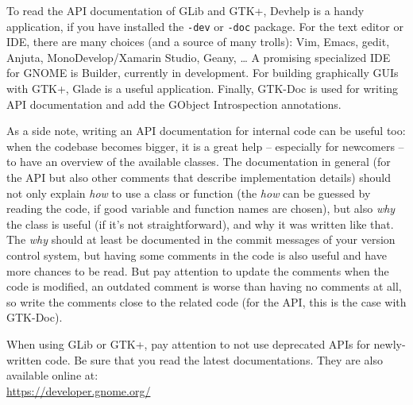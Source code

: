 To read the API documentation of GLib and GTK+, Devhelp is a handy application, if you have installed the \texttt{-dev} or \texttt{-doc} package. For the text editor or IDE, there are many choices (and a source of many trolls): Vim, Emacs, gedit, Anjuta, MonoDevelop/Xamarin Studio, Geany, … A promising specialized IDE for GNOME is Builder, currently in development. For building graphically GUIs with GTK+, Glade is a useful application. Finally, GTK-Doc is used for writing API documentation and add the GObject Introspection annotations.

As a side note, writing an API documentation for internal code can be useful too: when the codebase becomes bigger, it is a great help -- especially for newcomers -- to have an overview of the available classes. The documentation in general (for the API but also other comments that describe implementation details) should not only explain \emph{how} to use a class or function (the \emph{how} can be guessed by reading the code, if good variable and function names are chosen), but also \emph{why} the class is useful (if it's not straightforward), and why it was written like that. The \emph{why} should at least be documented in the commit messages of your version control system, but having some comments in the code is also useful and have more chances to be read. But pay attention to update the comments when the code is modified, an outdated comment is worse than having no comments at all, so write the comments close to the related code (for the API, this is the case with GTK-Doc).

When using GLib or GTK+, pay attention to not use deprecated APIs for newly-written code. Be sure that you read the latest documentations. They are also available online at:\\
\url{https://developer.gnome.org/}
